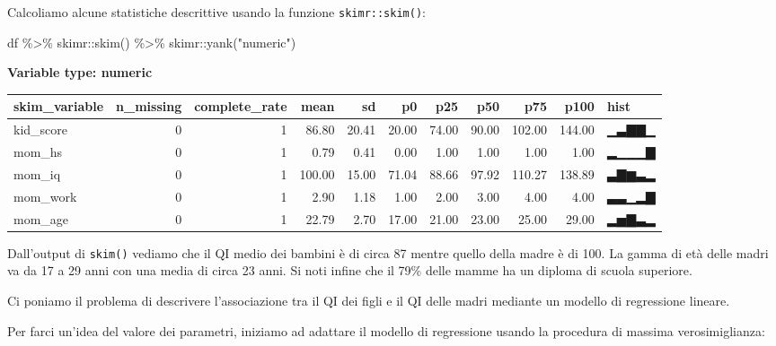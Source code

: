 \documentclass[
]{memoir}
\newenvironment{Shaded}{\begin{snugshade}}{\end{snugshade}}
\newcommand{\FunctionTok}[1]{\textcolor[rgb]{0.00,0.00,0.00}{#1}}
\newcommand{\NormalTok}[1]{#1}
\newcommand{\SpecialCharTok}[1]{\textcolor[rgb]{0.00,0.00,0.00}{#1}}
\newcommand{\StringTok}[1]{\textcolor[rgb]{0.31,0.60,0.02}{#1}}
\begin{document}
Calcoliamo alcune statistiche descrittive usando la funzione \texttt{skimr::skim()}:

\begin{Shaded}
\begin{Highlighting}[]
\NormalTok{df }\SpecialCharTok{\%\textgreater{}\%} 
\NormalTok{  skimr}\SpecialCharTok{::}\FunctionTok{skim}\NormalTok{() }\SpecialCharTok{\%\textgreater{}\%}
\NormalTok{  skimr}\SpecialCharTok{::}\FunctionTok{yank}\NormalTok{(}\StringTok{"numeric"}\NormalTok{)}
\end{Highlighting}
\end{Shaded}

\textbf{Variable type: numeric}

\begin{tabular}{l|r|r|r|r|r|r|r|r|r|l}
\hline
skim\_variable & n\_missing & complete\_rate & mean & sd & p0 & p25 & p50 & p75 & p100 & hist\\
\hline
kid\_score & 0 & 1 & 86.80 & 20.41 & 20.00 & 74.00 & 90.00 & 102.00 & 144.00 & ▁▃▇▇▁\\
\hline
mom\_hs & 0 & 1 & 0.79 & 0.41 & 0.00 & 1.00 & 1.00 & 1.00 & 1.00 & ▂▁▁▁▇\\
\hline
mom\_iq & 0 & 1 & 100.00 & 15.00 & 71.04 & 88.66 & 97.92 & 110.27 & 138.89 & ▃▇▆▃▂\\
\hline
mom\_work & 0 & 1 & 2.90 & 1.18 & 1.00 & 2.00 & 3.00 & 4.00 & 4.00 & ▃▃▁▂▇\\
\hline
mom\_age & 0 & 1 & 22.79 & 2.70 & 17.00 & 21.00 & 23.00 & 25.00 & 29.00 & ▂▅▇▃▂\\
\hline
\end{tabular}

Dall'output di \texttt{skim()} vediamo che il QI medio dei bambini è di circa 87 mentre quello della madre è di 100. La gamma di età delle madri va da 17 a 29 anni con una media di circa 23 anni. Si noti infine che il 79\% delle mamme ha un diploma di scuola superiore.

Ci poniamo il problema di descrivere l'associazione tra il QI dei figli e il QI delle madri mediante un modello di regressione lineare.

Per farci un'idea del valore dei parametri, iniziamo ad adattare il modello di regressione usando la procedura di massima verosimiglianza:
\end{document}
